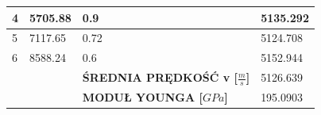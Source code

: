 \documentclass{article}
\begin{document}
\begin{table}[!htbp]
{\begin{tabular}{ll|l|l|}
\multicolumn{1}{|l|}{4}                             & 5705.88                           & 0.9                                              & 5135.292                           \\ \hline
\multicolumn{1}{|l|}{5}                             & 7117.65                           & 0.72                                             & 5124.708                           \\ \hline
\multicolumn{1}{|l|}{6}                             & 8588.24                           & 0.6                                              & 5152.944                           \\ \hline
                                                    &                                   & \textbf{ŚREDNIA PRĘDKOŚĆ v {[}$\frac{m}{s}${]}}            & 5126.639                           \\ \cline{3-4} 
                                                    &                                   & \textbf{MODUŁ YOUNGA {[}$GPa${]}}                  & 195.0903                           \\ \cline{3-4} 
\end{tabular}%
}
\end{table}
\end{document}
